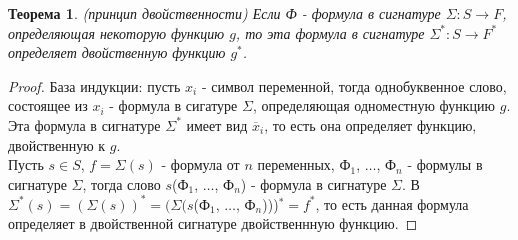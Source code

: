 \documentclass[a4paper, 12pt]{article}
\theoremstyle{definition}
\theoremstyle{plain}
\newtheorem*{theorem}{Теорема}
\theoremstyle{remark}
\begin{document}
  \begin{theorem}(принцип двойственности)
    Если Ф - формула в сигнатуре $\Sigma: S\to F$, определяющая некоторую функцию $g$, то эта формула в сигнатуре $\Sigma^*: S\to F^*$ определяет двойственную функцию $g^*$.
  \end{theorem}
  \begin{proof}
    База индукции: пусть $x_i$ - символ переменной, тогда однобуквенное слово, состоящее из $x_i$ - формула в сигатуре $\Sigma$, определяющая одноместную функцию $g$. Эта формула в сигнатуре $\Sigma^*$ имеет вид $\overline{x}_i$, то есть она определяет функцию, двойственную к $g$.\\
    Пусть $s\in S$, $f=\Sigma(s)$ - формула от $n$ переменных, Ф$_1$, $\ldots$, Ф$_n$ - формулы в сигнатуре $\Sigma$, тогда слово $s$(Ф$_1$, $\ldots$, Ф$_n$) - формула в сигнатуре $\Sigma$. В $\Sigma^*(s)=(\Sigma(s))^*=(\Sigma(s$(Ф$_1$, $\ldots$, Ф$_n$)))$^*=f^*$, то есть данная формула определяет в двойственной сигнатуре двойственнную функцию.
  \end{proof}
\end{document}
